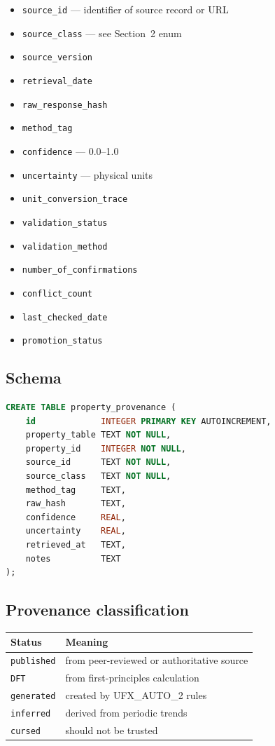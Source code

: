 \documentclass[11pt, a4paper]{article}
\begin{document}
\begin{itemize}[itemsep=1pt, leftmargin=*]
  \item \texttt{source\_id} --- identifier of source record or URL
  \item \texttt{source\_class} --- see Section~2 enum
  \item \texttt{source\_version}
  \item \texttt{retrieval\_date}
  \item \texttt{raw\_response\_hash}
  \item \texttt{method\_tag}
  \item \texttt{confidence} --- 0.0--1.0
  \item \texttt{uncertainty} --- physical units
  \item \texttt{unit\_conversion\_trace}
  \item \texttt{validation\_status}
  \item \texttt{validation\_method}
  \item \texttt{number\_of\_confirmations}
  \item \texttt{conflict\_count}
  \item \texttt{last\_checked\_date}
  \item \texttt{promotion\_status}
\end{itemize}

\subsection{Schema}

\begin{lstlisting}[language=SQL]
CREATE TABLE property_provenance (
    id             INTEGER PRIMARY KEY AUTOINCREMENT,
    property_table TEXT NOT NULL,
    property_id    INTEGER NOT NULL,
    source_id      TEXT NOT NULL,
    source_class   TEXT NOT NULL,
    method_tag     TEXT,
    raw_hash       TEXT,
    confidence     REAL,
    uncertainty    REAL,
    retrieved_at   TEXT,
    notes          TEXT
);
\end{lstlisting}

\subsection{Provenance classification}

\begin{center}
\begin{tabular}{ll}
\toprule
\textbf{Status} & \textbf{Meaning} \\
\midrule
\texttt{published}   & from peer-reviewed or authoritative source \\
\texttt{DFT}         & from first-principles calculation \\
\texttt{generated}   & created by UFX\_AUTO\_2 rules \\
\texttt{inferred}    & derived from periodic trends \\
\texttt{cursed}      & should not be trusted \\
\bottomrule
\end{tabular}
\end{center}
\end{document}
